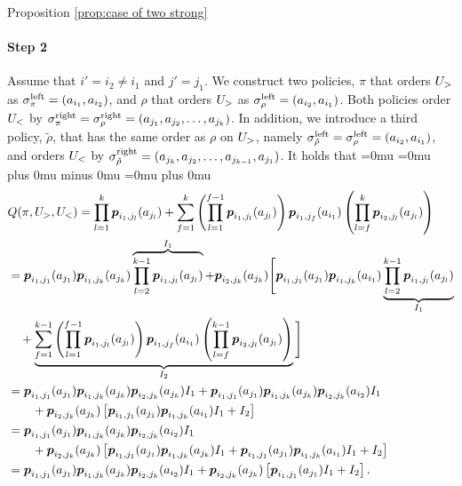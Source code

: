 \begin{proofof}{Proposition \ref{prop:case of two strong}}
\paragraph{Step 2} Assume that $i'=i_2\neq i_1$ and $j'=j_1$. We construct two policies, $\pi$ that orders $U_>$ as $\sigma^{\textnormal{left}}_\pi=(a_{i_1},a_{i_2})$, and $\rho$ that orders $U_>$ as  $\sigma^{\textnormal{left}}_\rho=(a_{i_2},a_{i_1})$. Both policies order $U_<$ by $\sigma^{\textnormal{right}}_\pi=\sigma^{\textnormal{right}}_\rho=(a_{j_1},a_{j_2}, \dots, a_{j_k})$. In addition, we introduce a third policy, $\tilde \rho$, that has the same order as $\rho$ on $U_>$, namely $\sigma^{\textnormal{left}}_{\tilde \rho}=\sigma^{\textnormal{left}}_\rho=(a_{i_2},a_{i_1})$, and orders $U_<$ by $\sigma^{\textnormal{right}}_{\tilde \rho}=(a_{j_k},a_{j_2},\dots ,a_{j_{k-1}},a_{j_1})$.
It holds that
{\thinmuskip=0mu
\medmuskip=0mu plus 0mu minus 0mu
\thickmuskip=0mu plus 0mu
\begin{align}\label{eq: multiple transitions}
&Q(\pi,\ug,\ul)=\prod_{l=1}^k \bl p_{{i_1},{j_l}}(a_{j_l})+\sum_{f=1}^{k} \left(\prod_{l=1}^{f-1} \bl p_{{i_1},{j_l}}(a_{j_l})\right) \bl p_{{i_1},{j_f}}(a_{i_1}) \left(\prod_{l=f}^{k} \bl p_{{i_2},{j_l}}(a_{j_l})\right)\nonumber\\
&=\bl p_{{i_1},{j_1}}(a_{j_1})\bl p_{{i_1},{j_k}}(a_{j_k})\overbrace{\prod_{l=2}^{k-1} \bl p_{{i_1},{j_l}}(a_{j_l})}^{I_1}+\bl p_{{i_2},{j_k}}(a_{j_k})\Bigg[\bl p_{{i_1},{j_1}}(a_{j_1})\bl p_{{i_1},{j_k}}(a_{i_1})\underbrace{\prod_{l=2}^{k-1} \bl p_{{i_1},{j_l}}(a_{j_l})}_{I_1}\nonumber\\
&\quad+\underbrace{\sum_{f=1}^{k-1} \left(\prod_{l=1}^{f-1} \bl p_{{i_1},{j_l}}(a_{j_l})\right) \bl p_{{i_1},{j_f}}(a_{i_1}) \left(\prod_{l=f}^{k-1} \bl p_{{i_2},{j_l}}(a_{j_l})\right)}_{I_2}\Bigg]\nonumber\\
&= \bl p_{{i_1},{j_1}}(a_{j_1})\bl p_{{i_1},{j_k}}(a_{j_k})\bl p_{{i_2},{j_k}}(a_{j_k})I_1 +\bl p_{{i_1},{j_1}}(a_{j_1})\bl p_{{i_1},{j_k}}(a_{j_k})\bl p_{{i_2},{j_k}}(a_{i_2})I_1\nonumber\\
&\qquad+\bl p_{{i_2},{j_k}}(a_{j_k})\left[\bl p_{{i_1},{j_1}}(a_{j_1})\bl p_{{i_1},{j_k}}(a_{i_1})I_1+I_2\right]\nonumber\\
&=\bl p_{{i_1},{j_1}}(a_{j_1})\bl p_{{i_1},{j_k}}(a_{j_k})\bl p_{{i_2},{j_k}}(a_{i_2})I_1\nonumber\\
&\qquad +\bl p_{{i_2},{j_k}}(a_{j_k})\left[\bl p_{{i_1},{j_1}}(a_{j_1})\bl p_{{i_1},{j_k}}(a_{j_k})I_1+\bl p_{{i_1},{j_1}}(a_{j_1})\bl p_{{i_1},{j_k}}(a_{i_1})I_1+I_2\right]\nonumber\\
&=\bl p_{{i_1},{j_1}}(a_{j_1})\bl p_{{i_1},{j_k}}(a_{j_k})\bl p_{{i_2},{j_k}}(a_{i_2})I_1+\bl p_{{i_2},{j_k}}(a_{j_k})\left[\bl p_{{i_1},{j_1}}(a_{j_1})I_1+I_2\right].

\end{align}}
\end{proofof}
